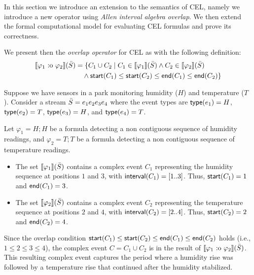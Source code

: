 In this section we introduce an extension to the semantics of CEL, namely we introduce a new operator using \textit{Allen interval algebra} \textit{overlap}. 
We then extend the formal computational model for evaluating CEL formulas and prove its correctness. 

We present then the \emph{overlap operator} for CEL as with the following definition:
\[ 
\begin{aligned}
	\sem{\varphi_1 \overlap \varphi_2}(\Stream)
	&= \{C_1 \cup C_2 \mid C_1 \in \sem{\varphi_1}(\Stream) 
	\land C_2 \in \sem{\varphi_2}(\Stream) \\
	&\quad \land \cstart(C_1) \leq \cstart(C_2) \leq \cend(C_1) \leq \cend(C_2)\}
\end{aligned}
\]
 
\begin{example} Suppose we have sensors in a park monitoring humidity ($H$) and temperature ($T$). Consider a stream $\bar{S} = e_1 e_2 e_3 e_4$ where the event types are $\mathsf{type}(e_1) = H$, $\mathsf{type}(e_2) = T$, $\mathsf{type}(e_3) = H$, and $\mathsf{type}(e_4) = T$. 

Let $\varphi_1 = H ; H$ be a formula detecting a non contiguous sequence of humidity readings, and $\varphi_2 = T ; T$ be a formula detecting a non contiguous sequence of temperature readings.
\begin{itemize}
	\item The set $\sem{\varphi_1}(\Stream)$ contains a complex event $C_1$ representing the humidity sequence at positions $1$ and $3$, with $\mathsf{interval}(C_1) = [1..3]$. Thus, $\mathsf{start}(C_1) = 1$ and $\mathsf{end}(C_1) = 3$.
	\item The set $\sem{\varphi_2}(\Stream)$ contains a complex event $C_2$ representing the temperature sequence at positions $2$ and $4$, with $\mathsf{interval}(C_2) = [2..4]$. Thus, $\mathsf{start}(C_2) = 2$ and $\mathsf{end}(C_2) = 4$.
\end{itemize}

Since the overlap condition $\mathsf{start}(C_1) \leq \mathsf{start}(C_2) \leq \mathsf{end}(C_1) \leq \mathsf{end}(C_2)$ holds (i.e., $1 \leq 2 \leq 3 \leq 4$), the complex event $C = C_1 \cup C_2$ is in the result of $\sem{\varphi_1 \overlap \varphi_2}(\Stream)$. This resulting complex event captures the period where a humidity rise was followed by a temperature rise that continued after the humidity stabilized.

\end{example}

